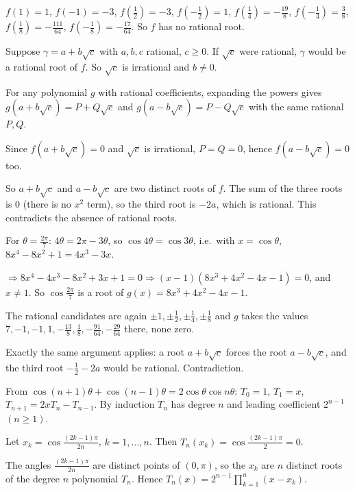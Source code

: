   $f(1) = 1$, $f(-1) = -3$, $f\left(\frac{1}{2}\right) = -3$, $f\left(-\frac{1}{2}\right) = 1$,
  $f\left(\frac{1}{4}\right) = -\frac{19}{8}$, $f\left(-\frac{1}{4}\right) = \frac{3}{8}$,
  $f\left(\frac{1}{8}\right) = -\frac{111}{64}$, $f\left(-\frac{1}{8}\right) = -\frac{17}{64}$. So $f$ has no rational
  root.

  Suppose $\gamma = a + b\sqrt{c}$ with $a, b, c$ rational, $c\geq 0$. If $\sqrt{c}$ were rational, $\gamma$ would be a
  rational root of $f$. So $\sqrt{c}$ is irrational and $b\neq 0$.

  For any polynomial $g$ with rational coefficients, expanding the powers gives $g(a + b\sqrt{c}) = P + Q\sqrt{c}$
  and $g(a - b\sqrt{c}) = P - Q\sqrt{c}$ with the same rational $P, Q$.

  Since $f(a + b\sqrt{c}) = 0$ and $\sqrt{c}$ is irrational, $P = Q = 0$, hence $f(a - b\sqrt{c}) = 0$ too.

  So $a + b\sqrt{c}$ and $a - b\sqrt{c}$ are two distinct roots of $f$. The sum of the three roots is $0$ (there
  is no $x^2$ term), so the third root is $-2a$, which is rational. This contradicts the absence of rational roots.

  For $\theta = \frac{2\pi}{7}$: $4\theta = 2\pi - 3\theta$, so $\cos4\theta = \cos3\theta$, i.e.\ with $x =
  \cos\theta$, $8x^4 - 8x^2 + 1 = 4x^3 - 3x$.

  $\Rightarrow 8x^4 - 4x^3 - 8x^2 + 3x + 1 = 0\Rightarrow (x - 1)(8x^3 + 4x^2 - 4x - 1) = 0$, and $x\neq 1$. So
  $\cos\frac{2\pi}{7}$ is a root of $g(x) = 8x^3 + 4x^2 - 4x - 1$.

  The rational candidates are again $\pm1, \pm\frac{1}{2}, \pm\frac{1}{4}, \pm\frac{1}{8}$ and $g$ takes the values
  $7, -1, -1, 1, -\frac{13}{8}, \frac{1}{8}, -\frac{91}{64}, -\frac{29}{64}$ there, none zero.

  Exactly the same argument applies: a root $a + b\sqrt{c}$ forces the root $a - b\sqrt{c}$, and the third root
  $-\frac{1}{2} - 2a$ would be rational. Contradiction.
\item From $\cos(n + 1)\theta + \cos(n - 1)\theta = 2\cos\theta\cos n\theta$: $T_0 = 1$, $T_1 = x$, $T_{n + 1} = 2xT_n
  - T_{n - 1}$. By induction $T_n$ has degree $n$ and leading coefficient $2^{n - 1}$ $(n\geq 1)$.

  Let $x_k = \cos\frac{(2k - 1)\pi}{2n}$, $k = 1, \ldots, n$. Then $T_n(x_k) = \cos\frac{(2k - 1)\pi}{2} = 0$.

  The angles $\frac{(2k - 1)\pi}{2n}$ are distinct points of $(0, \pi)$, so the $x_k$ are $n$ distinct roots of
  the degree $n$ polynomial $T_n$. Hence $T_n(x) = 2^{n - 1}\displaystyle\prod_{k = 1}^{n}(x - x_k)$.

